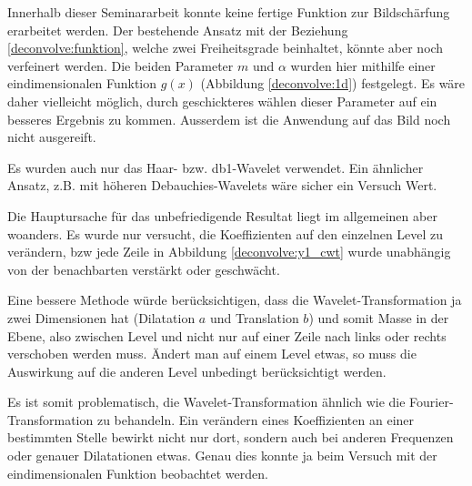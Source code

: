 Innerhalb dieser Seminararbeit konnte keine fertige Funktion zur Bildschärfung erarbeitet werden.
Der bestehende Ansatz mit der Beziehung \eqref{deconvolve:funktion}, welche zwei Freiheitsgrade beinhaltet, könnte aber noch verfeinert werden.
Die beiden Parameter $m$ und $\alpha$ wurden hier mithilfe einer eindimensionalen Funktion $g(x)$ (Abbildung \ref{deconvolve:1d}) festgelegt.
Es wäre daher vielleicht möglich, durch geschickteres wählen dieser Parameter auf ein besseres Ergebnis zu kommen.
Ausserdem ist die Anwendung auf das Bild noch nicht ausgereift.

Es wurden auch nur das Haar- bzw. db1-Wavelet verwendet.
Ein ähnlicher Ansatz, z.B. mit höheren Debauchies-Wavelets wäre sicher ein Versuch Wert.

Die Hauptursache für das unbefriedigende Resultat liegt im allgemeinen aber woanders.
Es wurde nur versucht, die Koeffizienten auf den einzelnen Level zu verändern, bzw jede Zeile in Abbildung \ref{deconvolve:y1_cwt} wurde unabhängig von der benachbarten verstärkt oder geschwächt.

Eine bessere Methode würde berücksichtigen, dass die Wavelet-Transformation ja zwei Dimensionen hat (Dilatation $a$ und Translation $b$) und somit \glqq Masse \grqq{} in der Ebene, also zwischen Level und nicht nur auf einer Zeile nach links oder rechts verschoben werden muss.
Ändert man auf einem Level etwas, so muss die Auswirkung auf die anderen Level unbedingt berücksichtigt werden.


Es ist somit problematisch, die Wavelet-Transformation ähnlich wie die Fourier-Transformation zu behandeln.
Ein verändern eines Koeffizienten an einer bestimmten Stelle bewirkt nicht nur dort, sondern auch bei anderen Frequenzen oder genauer Dilatationen etwas.
Genau dies konnte ja beim Versuch mit der eindimensionalen Funktion beobachtet werden.

